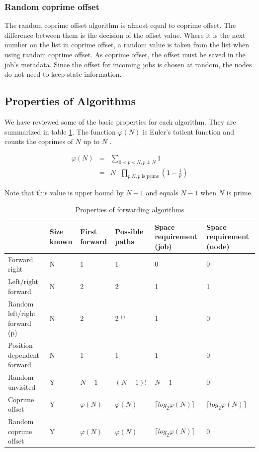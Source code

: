\documentclass[10pt,a4paper]{article}
\begin{document}
\subsubsection*{Random coprime offset}
The random coprime offset algorithm is almost equal to coprime offset. The difference between them is the decision of the offset value. Where it is the next number on the list in coprime offset, a random value is taken from the list when using random coprime offset. As coprime offset, the offset must be saved in the job's metadata. Since the offset for incoming jobs is chosen at random, the nodes do not need to keep state information.

\subsection{Properties of Algorithms}
\label{secprops}

We have reviewed some of the basic properties for each algorithm. They are summarized in table \ref{tabprops}. The function $\varphi(N)$ is Euler's totient function and counts the coprimes of $N$ up to $N$ \cite{EULER}.

\begin{eqnarray}
\varphi(N) &=& \sum_{0 < p < N, p \perp N} 1 \nonumber \\
&=&  N \cdot \prod_{p|N, p\text{ is prime}} (1-\frac{1}{p}) \nonumber
\end{eqnarray}

Note that this value is upper bound by $N-1$ and equals $N-1$ when $N$ is prime.

\begin{table}[h!]
\hspace{-0.12\textwidth}
\begin{tabular}{|p{}|p{}|p{}|p{}|p{}|p{}|} \cline{2-6}
\multicolumn{1}{l|}{}		& Size known	& First forward	& Possible paths	& Space requirement (job)	& Space requirement (node) \\ \hline
Forward right				& N				& 1				& 1					& 0							& 0		\\ \hline
Left/right forward			& N				& 2				& 2					& 1							& 1		\\ \hline
Random left/right forward (p) & N			& 2				& 2 $^($\footnotemark$^)$ & 1					& 0		\\ \hline
Position dependent forward	& N				& 1				& 1					& 1							& 0		\\ \hline
Random unvisited			& Y				& $N-1$			& $(N-1)!$			& $N-1$	& 0		\\ \hline
Coprime offset				& Y				& $\varphi(N)$		& $\varphi(N)$ 		& $\lceil log_2 \varphi(N) \rceil$	& $\lceil log_2 \varphi(N) \rceil$ \\ \hline
Random coprime offset		& Y				& $\varphi(N)$		& $\varphi(N)$			& $\lceil log_2 \varphi(N) \rceil$	& 0		\\ \hline
\end{tabular}
\caption{Properties of forwarding algorithms}
\label{tabprops}
\end{table}
\end{document}
